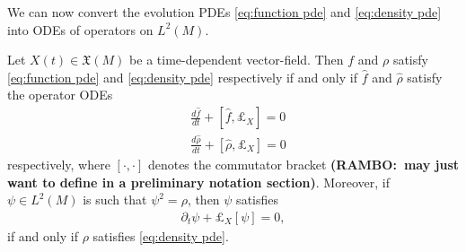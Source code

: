 \documentclass[final,leqno]{siamltex1213}
\newcommand{\ram}[1]{{\normalsize{\textbf{({\color{red}RAMBO:\ }#1)}}}}
\newcommand{\pder}[2]{\ensuremath{\frac{ \partial #1}{\partial #2}}}
\newtheorem{example}[theorem]{Example}
\begin{document}
%

We can now convert the evolution PDEs \eqref{eq:function pde} and \eqref{eq:density pde} into ODEs of operators on $L^{2}(M)$.

\begin{theorem} \label{thm:quantize}
	Let $X(t) \in \mathfrak{X}(M)$ be a time-dependent vector-field.
	Then $f$ and $\rho$ satisfy \eqref{eq:function pde} and \eqref{eq:density pde} respectively
	if and only if $\hat{f}$ and $\hat{\rho}$ satisfy the operator ODEs
	\begin{align}
		&\frac{d \hat{f} }{dt} + [ \hat{f} , \pounds_{X} ] = 0 \label{eq:quantum observable ode} \\
		&\frac{d \hat{\rho} }{dt} + [ \hat{\rho} , \pounds_{X} ] = 0 \label{eq:quantum density ode}
	\end{align}
	respectively, where $[ \cdot , \cdot ]$ denotes the commutator bracket \ram{may just want to define in a preliminary notation section}.
	Moreover, if $\psi \in L^{2}(M)$ is such that $\psi^{2} = \rho$, then $\psi$ satisfies
	\begin{align}
		 \partial_{t} \psi + \pounds_{X}[\psi] = 0, \label{eq:half density pde}
	\end{align}
	if and only if $\rho$ satisfies \eqref{eq:density pde}.
\end{theorem}
\end{document}
